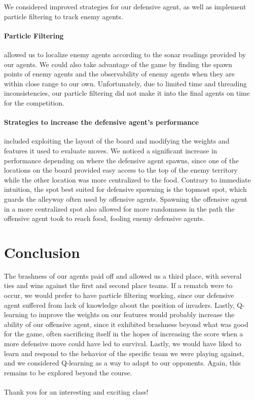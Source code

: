 \documentclass[]{article}
\begin{document}
We considered improved strategies for our defensive agent, as well as implement particle filtering to track enemy agents. 

\paragraph{Particle Filtering} allowed us to localize enemy agents according to the sonar readings provided by our agents. We could also take advantage of the game by finding the spawn points of enemy agents and the observability of enemy agents when they are within close range to our own. Unfortunately, due to limited time and threading inconsistencies, our particle filtering did not make it into the final agents on time for the competition. 

\paragraph{Strategies to increase the defensive agent's performance} included exploiting the layout of the board and modifying the weights and features it used to evaluate moves. We noticed a significant increase in performance depending on where the defensive agent spawns, since one of the locations on the board provided easy access to the top of the enemy territory while the other location was more centralized to the food. Contrary to immediate intuition, the spot best suited for defensive spawning is the topmost spot, which guards the alleyway often used by offensive agents. Spawning the offensive agent in a more centralized spot also allowed for more randomness in the path the offensive agent took to reach food, fooling enemy defensive agents.


\section{Conclusion}

The brashness of our agents paid off and allowed us a third place, with several ties and wins against the first and second place teams. If a rematch were to occur, we would prefer to have particle filtering working, since our defensive agent suffered from lack of knowledge about the position of invaders. Lastly, Q-learning to improve the weights on our features would probably increase the ability of our offensive agent, since it exhibited brashness beyond what was good for the game, often sacrificing itself in the hopes of increasing the score when a more defensive move could have led to survival. Lastly, we would have liked to learn and respond to the behavior of the specific team we were playing against, and we considered Q-learning as a way to adapt to our opponents. Again, this remains to be explored beyond the course.

\paragraph{}

Thank you for an interesting and exciting class!
\end{document}
